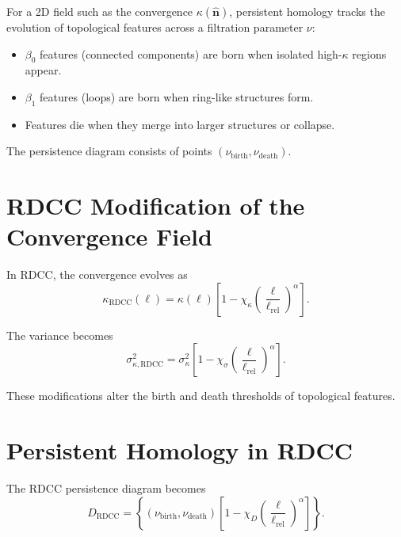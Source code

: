 \documentclass[11pt,a4paper]{article}
\begin{document}
For a 2D field such as the convergence $\kappa(\hat{\mathbf{n}})$, persistent 
homology tracks the evolution of topological features across a filtration 
parameter $\nu$:

\begin{itemize}
    \item $\beta_{0}$ features (connected components) are born when isolated 
          high-$\kappa$ regions appear.
    \item $\beta_{1}$ features (loops) are born when ring-like structures form.
    \item Features die when they merge into larger structures or collapse.
\end{itemize}

The persistence diagram consists of points $(\nu_{\mathrm{birth}},\nu_{\mathrm{death}})$.
\section{RDCC Modification of the Convergence Field}

In RDCC, the convergence evolves as
\begin{equation}
    \kappa_{\mathrm{RDCC}}(\ell)
    = \kappa(\ell)
      \left[
        1 - \chi_{\kappa}
        \left(\frac{\ell}{\ell_{\mathrm{rel}}}\right)^{\alpha}
      \right].
\end{equation}

The variance becomes
\begin{equation}
    \sigma_{\kappa,\mathrm{RDCC}}^{2}
    = \sigma_{\kappa}^{2}
      \left[
        1 - \chi_{\sigma}
        \left(\frac{\ell}{\ell_{\mathrm{rel}}}\right)^{\alpha}
      \right].
\end{equation}

These modifications alter the birth and death thresholds of topological features.
\section{Persistent Homology in RDCC}

The RDCC persistence diagram becomes
\begin{equation}
    D_{\mathrm{RDCC}}
    = \left\{
        \left(
          \nu_{\mathrm{birth}},
          \nu_{\mathrm{death}}
        \right)
        \left[
          1 - \chi_{D}
          \left(\frac{\ell}{\ell_{\mathrm{rel}}}\right)^{\alpha}
        \right]
      \right\}.
\end{equation}
\end{document}
